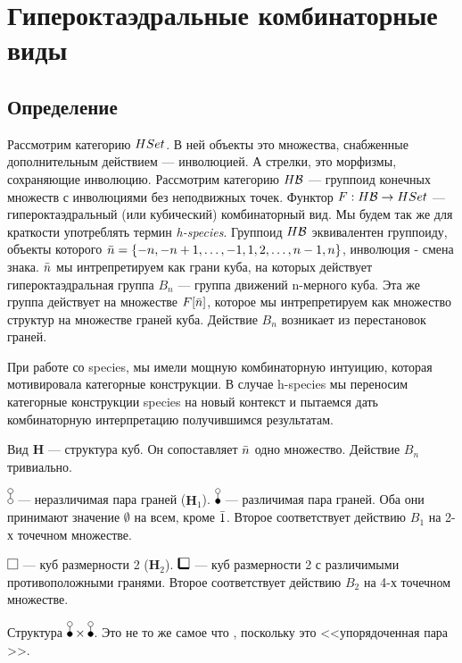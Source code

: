 \section{Гипероктаэдральные комбинаторные виды}
\subsection{Определение}
Рассмотрим категорию $HSet$. В ней объекты это множества, снабженные
дополнительным действием --- инволюцией. А стрелки, это морфизмы, сохраняющие инволюцию. 
Рассмотрим категорию $H\mathcal B$ --- группоид конечных множеств с инволюциями без неподвижных точек.
Функтор $F:H\mathcal B \rightarrow HSet$ --- гипероктаэдральный (или кубический)
комбинаторный вид. Мы будем так же для краткости употреблять термин
\emph{h-species}. Группоид $H\mathcal B$ эквивалентен группоиду, объекты которого $\Bar
n = \{-n, -n+1, \dots, -1, 1, 2, \dots, n-1, n\}$, инволюция - смена знака.
$\Bar n$ мы интрепретируем как грани куба, на которых действует
гипероктаэдральная группа $B_n$ --- группа движений n-мерного куба.
Эта же группа действует на множестве $F[\Bar n]$, которое мы
интрепретируем как множество структур на множестве граней куба. Действие
$B_n$ возникает из перестановок граней.

\begin{remark}
При работе со species, мы имели мощную комбинаторную интуицию, которая
мотивировала категорные конструкции. В случае h-species мы переносим категорные
конструкции species на новый контекст и пытаемся дать комбинаторную
интерпретацию получившимся результатам.
\end{remark}

\begin{example}
Вид $\mathbf H$ --- структура куб. Он сопоставляет $\Bar n$ одно множество.
Действие $B_n$ тривиально.
\end{example}
\begin{example}
$\dA$ --- неразличимая пара граней ($\mathbf H_1$). $\dB$ --- различимая пара
граней.
Оба они принимают значение $\emptyset$ на всем, кроме $\Bar 1$. Второе
соответствует действию $B_1$ на 2-х точечном множестве.
\end{example}
\begin{example}
$\dAA$ --- куб размерности 2 ($\mathbf H_2$). $\dBB$ ---
куб размерности 2 с различимыми противоположными гранями.  Второе
соответствует действию $B_2$ на 4-х точечном множестве.
\end{example}
\begin{example}
Структура $\dB \times \dB$. Это не то же самое что \dBB, поскольку это <<упорядоченная пара \dB>>.
\end{example}

